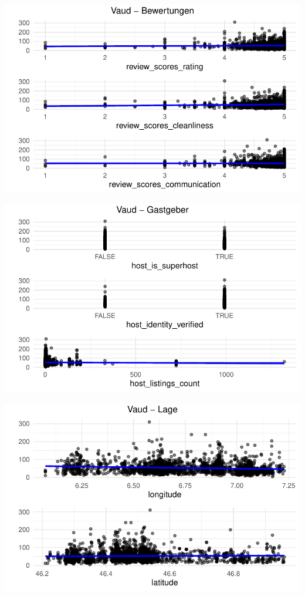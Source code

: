 \documentclass[
  journal,
]{IEEEtran}%
\begin{document}
\includegraphics{main_files/figure-pdf/unnamed-chunk-12-4.pdf}

\includegraphics{main_files/figure-pdf/unnamed-chunk-12-5.pdf}

\includegraphics{main_files/figure-pdf/unnamed-chunk-12-6.pdf}
\end{document}
